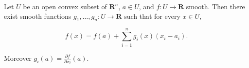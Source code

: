 Let $U$ be an open convex subset of $\mathbf{R}^n$, $a \in U$, and $f: U \to \mathbf{R}$ smooth. Then there exist smooth functions $g_1, \ldots, g_n: U \to \mathbf{R}$ such that for every $x \in U$,

$$f(x) = f(a) + \sum_{i=1}^{n} g_i(x)(x_i - a_i).$$

Moreover $g_i(a) = \frac{\partial f}{\partial x_i}(a)$.
